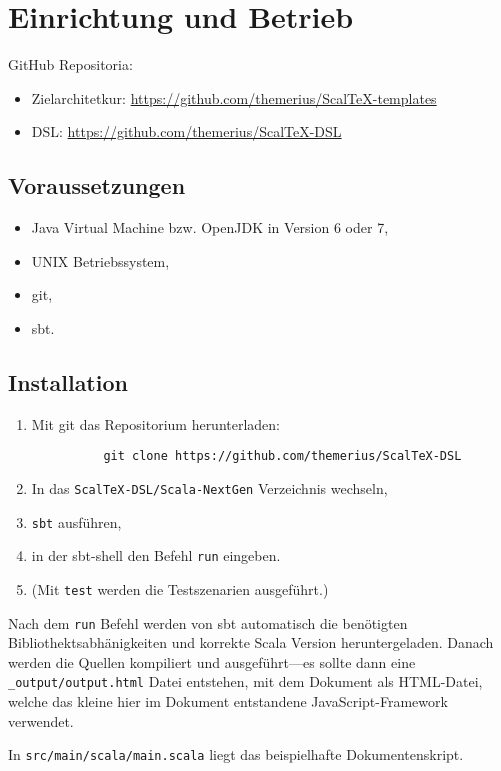 \chapter{Einrichtung und Betrieb}

GitHub Repositoria:

\begin{itemize}
  \item Zielarchitetkur: \url{https://github.com/themerius/ScalTeX-templates}
  \item DSL: \url{https://github.com/themerius/ScalTeX-DSL}
\end{itemize}

\section{Voraussetzungen}

\begin{itemize}
  \item Java Virtual Machine bzw. OpenJDK in Version 6 oder 7,
  \item UNIX Betriebssystem,
  \item git,
  \item sbt.
\end{itemize}

\section{Installation}

\begin{enumerate}
  \item Mit git das Repositorium herunterladen:
        \begin{verbatim}
          git clone https://github.com/themerius/ScalTeX-DSL
        \end{verbatim}
  \item In das \verb+ScalTeX-DSL/Scala-NextGen+ Verzeichnis wechseln,
  \item \verb+sbt+ ausführen,
  \item in der sbt-shell den Befehl \verb+run+ eingeben.
  \item (Mit \verb+test+ werden die Testszenarien ausgeführt.)
\end{enumerate}

Nach dem \verb+run+ Befehl werden von sbt automatisch die benötigten
Bibliothektsabhänigkeiten und korrekte Scala Version heruntergeladen.
Danach werden die Quellen kompiliert und ausgeführt---es sollte dann eine
\verb+_output/output.html+ Datei entstehen, mit dem Dokument als HTML-Datei,
welche das kleine hier im Dokument entstandene JavaScript-Framework verwendet.

In \verb+src/main/scala/main.scala+ liegt das
beispielhafte Dokumentenskript.
